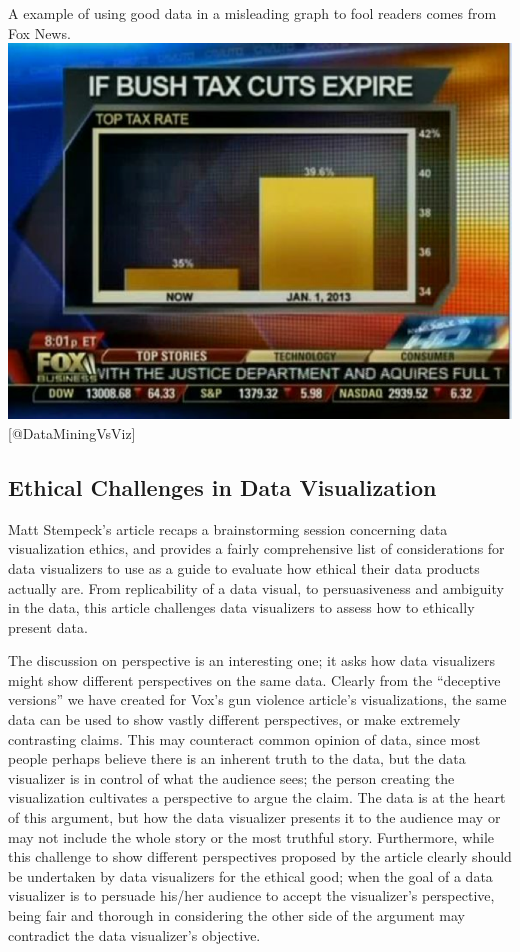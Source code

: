 \documentclass[]{book}
\theoremstyle{definition}
\theoremstyle{definition}
\theoremstyle{definition}
\theoremstyle{remark}
\begin{document}
A example of using good data in a misleading graph to fool readers comes
from Fox News. \includegraphics{images/1.png} {[}@DataMiningVsViz{]}

\subsection{Ethical Challenges in Data
Visualization}\label{ethical-challenges-in-data-visualization}

Matt Stempeck's article recaps a brainstorming session concerning data
visualization ethics, and provides a fairly comprehensive list of
considerations for data visualizers to use as a guide to evaluate how
ethical their data products actually are. From replicability of a data
visual, to persuasiveness and ambiguity in the data, this article
challenges data visualizers to assess how to ethically present data.

The discussion on perspective is an interesting one; it asks how data
visualizers might show different perspectives on the same data. Clearly
from the ``deceptive versions'' we have created for Vox's gun violence
article's visualizations, the same data can be used to show vastly
different perspectives, or make extremely contrasting claims. This may
counteract common opinion of data, since most people perhaps believe
there is an inherent truth to the data, but the data visualizer is in
control of what the audience sees; the person creating the visualization
cultivates a perspective to argue the claim. The data is at the heart of
this argument, but how the data visualizer presents it to the audience
may or may not include the whole story or the most truthful story.
Furthermore, while this challenge to show different perspectives
proposed by the article clearly should be undertaken by data visualizers
for the ethical good; when the goal of a data visualizer is to persuade
his/her audience to accept the visualizer's perspective, being fair and
thorough in considering the other side of the argument may contradict
the data visualizer's objective.
\end{document}
